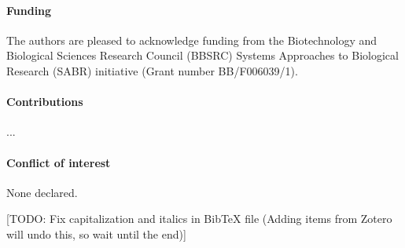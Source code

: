 \documentclass{bioinfo}
\newcommand{\note}[1]{{\color{red}[#1]}}
\begin{document}
\paragraph{Funding\textcolon} The authors are pleased to acknowledge funding from the Biotechnology and Biological Sciences Research Council (BBSRC) Systems Approaches to Biological Research (SABR) initiative (Grant number BB/F006039/1). 

\paragraph{Contributions\textcolon} ...

\paragraph{Conflict of interest\textcolon} None declared.





\note{TODO: Fix capitalization and italics in BibTeX file (Adding items from Zotero will undo this, so wait until the end)}
\end{document}

